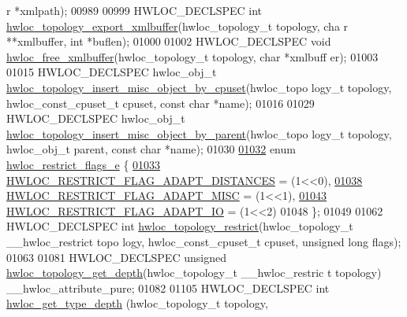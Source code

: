 \begin{DoxyCode}
{      r} *xmlpath);
00989 
00999 HWLOC\_DECLSPEC \textcolor{keywordtype}{int} \hyperlink{a00045_ga739330e9402425315e44e5012631fb91}{hwloc_topology_export_xmlbuffer}(hwloc\_topology\_t topology, \textcolor{keywordtype}{cha
      r} **xmlbuffer, \textcolor{keywordtype}{int} *buflen);
01000 
01002 HWLOC\_DECLSPEC \textcolor{keywordtype}{void} \hyperlink{a00045_ga5e375acef034bebc1f20ead884697301}{hwloc_free_xmlbuffer}(hwloc\_topology\_t topology, \textcolor{keywordtype}{char} *xmlbuff
      er);
01003 
01015 HWLOC\_DECLSPEC hwloc\_obj\_t \hyperlink{a00045_ga017a9ba16d554326c6e3812d545d7230}{hwloc_topology_insert_misc_object_by_cpuset}(hwloc\_topo
      logy\_t topology, hwloc\_const\_cpuset\_t cpuset, \textcolor{keyword}{const} \textcolor{keywordtype}{char} *name);
01016 
01029 HWLOC\_DECLSPEC hwloc\_obj\_t \hyperlink{a00045_gadacd7a3d21220fbb30c3256d8b22a294}{hwloc_topology_insert_misc_object_by_parent}(hwloc\_topo
      logy\_t topology, hwloc\_obj\_t parent, \textcolor{keyword}{const} \textcolor{keywordtype}{char} *name);
01030 
\hypertarget{a00033_source_l01032}{}\hyperlink{a00045_ga9d80f08eb25b7ac22f1b998dc8bf521f}{01032} \textcolor{keyword}{enum} \hyperlink{a00045_ga9d80f08eb25b7ac22f1b998dc8bf521f}{hwloc_restrict_flags_e} \{
\hypertarget{a00033_source_l01033}{}\hyperlink{a00045_gga9d80f08eb25b7ac22f1b998dc8bf521fa4d18407f5520793b50b9e892f5bb55d1}{01033}   \hyperlink{a00045_gga9d80f08eb25b7ac22f1b998dc8bf521fa4d18407f5520793b50b9e892f5bb55d1}{HWLOC_RESTRICT_FLAG_ADAPT_DISTANCES} = (1<<0),
\hypertarget{a00033_source_l01038}{}\hyperlink{a00045_gga9d80f08eb25b7ac22f1b998dc8bf521fa699969227a09bbc1a7de51dc9fb7be4b}{01038}   \hyperlink{a00045_gga9d80f08eb25b7ac22f1b998dc8bf521fa699969227a09bbc1a7de51dc9fb7be4b}{HWLOC_RESTRICT_FLAG_ADAPT_MISC} = (1<<1),
\hypertarget{a00033_source_l01043}{}\hyperlink{a00045_gga9d80f08eb25b7ac22f1b998dc8bf521faa95d6985e36ec1e55f68b210297a85cb}{01043}   \hyperlink{a00045_gga9d80f08eb25b7ac22f1b998dc8bf521faa95d6985e36ec1e55f68b210297a85cb}{HWLOC_RESTRICT_FLAG_ADAPT_IO} = (1<<2)
01048 \};
01049 
01062 HWLOC\_DECLSPEC \textcolor{keywordtype}{int} \hyperlink{a00045_gad75fa918e3eb54663bdeab25ed89b648}{hwloc_topology_restrict}(hwloc\_topology\_t \_\_hwloc\_restrict topo
      logy, hwloc\_const\_cpuset\_t cpuset, \textcolor{keywordtype}{unsigned} \textcolor{keywordtype}{long} flags);
01063 
01081 HWLOC\_DECLSPEC \textcolor{keywordtype}{unsigned} \hyperlink{a00046_ga8c30b0cec55074eb3ed34e4f2a1a9937}{hwloc_topology_get_depth}(hwloc\_topology\_t \_\_hwloc\_restric
      t topology) \_\_hwloc\_attribute\_pure;
01082 
01105 HWLOC\_DECLSPEC \textcolor{keywordtype}{int} \hyperlink{a00046_gaea7c64dd59467f5201ba87712710b14d}{hwloc_get_type_depth} (hwloc\_topology\_t topology, 

\end{DoxyCode}

